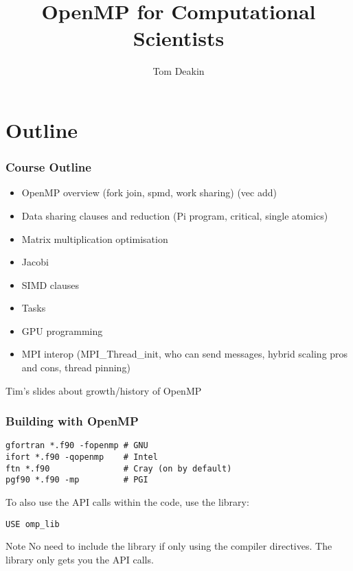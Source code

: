 \documentclass{beamer}
\author{Tom Deakin}
\title{OpenMP for Computational Scientists}
\begin{document}
\frame{\titlepage}

\section{Outline}
\begin{frame}
\frametitle{Course Outline}
\begin{itemize}
  \item OpenMP overview (fork join, spmd, work sharing) (vec add)
  \item Data sharing clauses and reduction (Pi program, critical, single atomics)
  \item Matrix multiplication optimisation
  \item Jacobi
  \item SIMD clauses
  \item Tasks
  \item GPU programming
  \item MPI interop (MPI\_Thread\_init, who can send messages, hybrid scaling pros and cons, thread pinning)
\end{itemize}
\end{frame}

\begin{frame}
Tim's slides about growth/history of OpenMP
\end{frame}

\begin{frame}[fragile]
\frametitle{Building with OpenMP}

\begin{verbatim}
gfortran *.f90 -fopenmp # GNU
ifort *.f90 -qopenmp    # Intel
ftn *.f90               # Cray (on by default)
pgf90 *.f90 -mp         # PGI
\end{verbatim}

To also use the API calls within the code, use the library:
\begin{verbatim}
USE omp_lib
\end{verbatim}

\begin{alertblock}{Note}
No need to include the library if only using the compiler directives.
The library only gets you the API calls.
\end{alertblock}


\end{frame}
\end{document}
